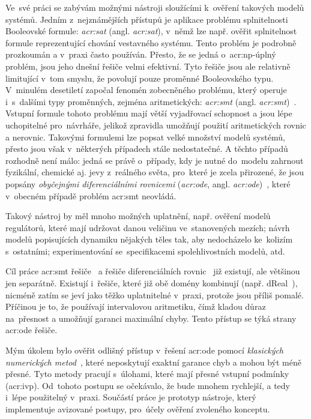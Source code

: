 \documentclass[thesis=M,czech]{FITthesis}[2012/06/26]
\newcommand{\acrlabel}[1]{acr:#1}
\newcommand{\acr}[1]{\acrshort{\acrlabel{#1}}}
\newcommand{\acrl}[1]{\acrlong{\acrlabel{#1}}}
\newcommand{\hl}[1]{\textit{#1}}
\newcommand{\name}[1]{\hl{#1}}
\newcommand{\cit}[1]{\cite{#1}}
\begin{document}
\begin{introduction}
Ve~své práci se zabývám možnými nástroji
sloužícími k~ověření takových modelů systémů.
Jedním z~nejznámějších přístupů
je aplikace problému splnitelnosti Booleovské formule:
\name{\acr{sat}} (angl. \name{\acrl{sat}}),
v~němž lze např. ověřit splnitelnost
formule reprezentující chování vestavného systému.
Tento problém je podrobně prozkoumán
a v~praxi často používán.
Přesto, že se jedná o~\acr{np}-úplný problém,
jsou jeho dnešní řešiče velmi efektivní.
Tyto řešiče jsou ale relativně limitující
v~tom smyslu, že povolují pouze proměnné Booleovského typu.
V~minulém desetiletí započal fenomén
zobecněného problému,
který operuje i~s~dalšími typy proměnných,
zejména aritmetických: \name{\acr{smt}}
(angl. \name{\acrl{smt}})~\cit{smt-de_moura}\cit{smt}.
Vstupní formule tohoto problému mají
větší vyjadřovací schopnost
a jsou lépe uchopitelné pro~návrháře,
jelikož zpravidla umožňují použití
aritmetických rovnic a nerovnic.
Takovými formulemi lze popsat velké množství modelů systémů,
přesto jsou však v~některých případech stále nedostatečné.
A těchto případů rozhodně není málo:
jedná se právě o~případy, kdy je nutné
do~modelu zahrnout fyzikální, chemické aj.
jevy z~reálného světa,
pro~které je zcela přirozené,
že jsou popsány \name{obyčejnými diferenciálními rovnicemi}
(\name{\acr{ode}}, angl. \name{\acrl{ode}})~\cit{ode-lec}\cit{ode},
které v~obecném případě problém \acr{smt} neovládá.

Takový nástroj by měl mnoho možných uplatnění,
např. ověření modelů regulátorů,
které mají udržovat danou veličinu ve~stanovených mezích;
návrh modelů popisujících dynamiku nějakých těles
tak, aby nedocházelo ke~kolizím s~ostatními;
experimentování se~specifikacemi
spolehlivostních modelů,
atd.


\begin{section}{Cíl práce}\label{s:intro:goal}
\acr{smt} řešiče~\cit{opensmt-art}\cit{cvc4-art}
a řešiče diferenciálních rovnic~\cit{sundials-art}\cit{odeint-art}
již existují, ale většinou jen separátně.
Existují i~řešiče, které již obě domény kombinují
(např. dReal~\cit{dreal-art}),
nicméně zatím se jeví jako těžko uplatnitelné v~praxi,
protože jsou příliš pomalé.
Příčinou je to, že používají intervalovou aritmetiku,
čímž kladou důraz na~přesnost
a umožňují garanci maximální chyby.
Tento přístup se týká strany
\acr{ode} řešiče.

Mým úkolem bylo ověřit
odlišný přístup v~řešení \acr{ode}
pomocí \name{klasických numerických metod}~\cit{ode-nsolve-intro},
které neposkytují exaktní garance chyb
a mohou být méně přesné.
Tyto metody pracují s~úlohami,
které mají přesné vstupní podmínky (\acr{ivp}).
Od~tohoto postupu se očekávalo,
že bude mnohem rychlejší,
a tedy i~lépe použitelný v~praxi.
Součástí práce je prototyp nástroje,
který implementuje avizované postupy,
pro~účely ověření zvoleného konceptu.


\end{section}
\end{introduction}
\end{document}
